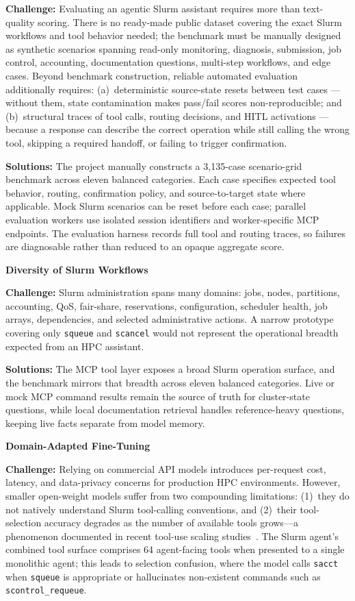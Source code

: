 \textbf{Challenge:} Evaluating an agentic Slurm assistant requires more than text-quality scoring. There is no ready-made public dataset covering the exact Slurm workflows and tool behavior needed; the benchmark must be manually designed as synthetic scenarios spanning read-only monitoring, diagnosis, submission, job control, accounting, documentation questions, multi-step workflows, and edge cases. Beyond benchmark construction, reliable automated evaluation additionally requires: (a)~deterministic source-state resets between test cases — without them, state contamination makes pass/fail scores non-reproducible; and (b)~structural traces of tool calls, routing decisions, and HITL activations — because a response can describe the correct operation while still calling the wrong tool, skipping a required handoff, or failing to trigger confirmation.

\textbf{Solutions:} The project manually constructs a 3,135-case scenario-grid benchmark across eleven balanced categories. Each case specifies expected tool behavior, routing, confirmation policy, and source-to-target state where applicable. Mock Slurm scenarios can be reset before each case; parallel evaluation workers use isolated session identifiers and worker-specific MCP endpoints. The evaluation harness records full tool and routing traces, so failures are diagnosable rather than reduced to an opaque aggregate score.

\noindent\textbf{Diversity of Slurm Workflows}

\textbf{Challenge:} Slurm administration spans many domains: jobs, nodes, partitions, accounting, QoS, fair-share, reservations, configuration, scheduler health, job arrays, dependencies, and selected administrative actions. A narrow prototype covering only \texttt{squeue} and \texttt{scancel} would not represent the operational breadth expected from an HPC assistant.

\textbf{Solutions:} The MCP tool layer exposes a broad Slurm operation surface, and the benchmark mirrors that breadth across eleven balanced categories. Live or mock MCP command results remain the source of truth for cluster-state questions, while local documentation retrieval handles reference-heavy questions, keeping live facts separate from model memory.

\noindent\textbf{Domain-Adapted Fine-Tuning}

\textbf{Challenge:} Relying on commercial API models introduces per-request cost, latency, and data-privacy concerns for production HPC environments. However, smaller open-weight models suffer from two compounding limitations: (1)~they do not natively understand Slurm tool-calling conventions, and (2)~their tool-selection accuracy degrades as the number of available tools grows---a phenomenon documented in recent tool-use scaling studies~\cite{qin2023toolllm}. The Slurm agent's combined tool surface comprises 64 agent-facing tools when presented to a single monolithic agent; this leads to selection confusion, where the model calls \texttt{sacct} when \texttt{squeue} is appropriate or hallucinates non-existent commands such as \texttt{scontrol\_requeue}.

